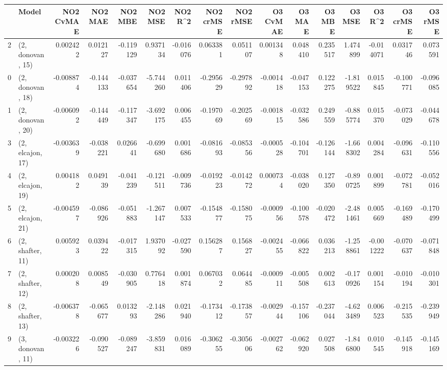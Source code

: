 \begin{tabular}{llrrrrrrrrrrrrrr}
\toprule
{} &             Model &  NO2 CvMAE &   NO2 MAE &   NO2 MBE &    NO2 MSE &   NO2 R\textasciicircum2 &  NO2 crMSE &  NO2 rMSE &  O3 CvMAE &    O3 MAE &    O3 MBE &     O3 MSE &    O3 R\textasciicircum2 &  O3 crMSE &   O3 rMSE \\
\midrule
2  &  (2, donovan, 15) &   0.002422 &  0.012127 & -0.119129 &   0.937134 & -0.016076 &   0.063381 &  0.051107 &  0.001348 &  0.048410 &  0.235517 &   1.474899 & -0.014071 &  0.031746 &  0.073591 \\
0  &  (2, donovan, 18) &  -0.008874 & -0.144133 & -0.037654 &  -5.744260 &  0.011406 &  -0.295629 & -0.297892 & -0.001418 & -0.047153 &  0.122275 &  -1.819522 &  0.015845 & -0.100771 & -0.096085 \\
1  &  (2, donovan, 20) &  -0.006092 & -0.144449 & -0.117347 &  -3.692175 &  0.006455 &  -0.197069 & -0.202569 & -0.001815 & -0.032586 &  0.249559 &  -0.885774 &  0.015370 & -0.073029 & -0.044678 \\
3  &  (2, elcajon, 17) &  -0.003639 & -0.038221 &  0.026641 &  -0.699680 &  0.001686 &  -0.081693 & -0.085356 & -0.000528 & -0.104701 & -0.126144 &  -1.668302 &  0.004284 & -0.096631 & -0.110556 \\
4  &  (2, elcajon, 19) &   0.004182 &  0.049139 & -0.041239 &  -0.121511 & -0.009736 &  -0.019223 & -0.014272 &  0.000734 & -0.038020 &  0.127350 &  -0.890725 &  0.001899 & -0.072781 & -0.052016 \\
5  &  (2, elcajon, 21) &  -0.004597 & -0.086926 & -0.051883 &  -1.267147 &  0.007533 &  -0.154877 & -0.158075 & -0.000956 & -0.100578 & -0.020472 &  -2.481461 &  0.005669 & -0.169489 & -0.170499 \\
6  &  (2, shafter, 11) &   0.005923 &  0.039422 & -0.017315 &   1.937092 & -0.027590 &   0.156287 &  0.156827 & -0.002455 & -0.066822 &  0.036213 &  -1.258861 & -0.001222 & -0.070637 & -0.071848 \\
7  &  (2, shafter, 12) &   0.000208 &  0.008549 & -0.030905 &   0.776418 &  0.001874 &   0.067032 &  0.064485 & -0.000911 & -0.005508 &  0.002613 &  -0.170926 &  0.001154 & -0.010194 & -0.010301 \\
8  &  (2, shafter, 13) &  -0.006378 & -0.065677 &  0.013293 &  -2.148286 &  0.021940 &  -0.173412 & -0.173857 & -0.002944 & -0.157106 & -0.237044 &  -4.623489 &  0.006523 & -0.215535 & -0.239949 \\
9  &  (3, donovan, 11) &  -0.003226 & -0.090527 & -0.089247 &  -3.859831 &  0.016089 &  -0.306255 & -0.305606 & -0.002762 & -0.062920 &  0.027508 &  -1.846800 &  0.010545 & -0.145918 & -0.145169 \\

\end{tabular}
